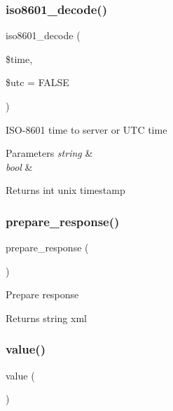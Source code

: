 \subsubsection{\texorpdfstring{iso8601\+\_\+decode()}{iso8601\_decode()}}
{\footnotesize\ttfamily iso8601\+\_\+decode (\begin{DoxyParamCaption}\item[{}]{\$time,  }\item[{}]{\$utc = {\ttfamily FALSE} }\end{DoxyParamCaption})}

I\+S\+O-\/8601 time to server or U\+TC time


\begin{DoxyParams}{Parameters}
{\em string} & \\
\hline
{\em bool} & \\
\hline
\end{DoxyParams}
\begin{DoxyReturn}{Returns}
int unix timestamp 
\end{DoxyReturn}
\mbox{\label{class_x_m_l___r_p_c___response_ac6925a06291928e6d4e8e53ea10fb1e2}} 
\subsubsection{\texorpdfstring{prepare\+\_\+response()}{prepare\_response()}}
{\footnotesize\ttfamily prepare\+\_\+response (\begin{DoxyParamCaption}{ }\end{DoxyParamCaption})}

Prepare response

\begin{DoxyReturn}{Returns}
string xml 
\end{DoxyReturn}
\mbox{\label{class_x_m_l___r_p_c___response_aefbfa229f1c9e1fc967bff724a010f9e}} 
\subsubsection{\texorpdfstring{value()}{value()}}
{\footnotesize\ttfamily value (\begin{DoxyParamCaption}{ }\end{DoxyParamCaption})}

